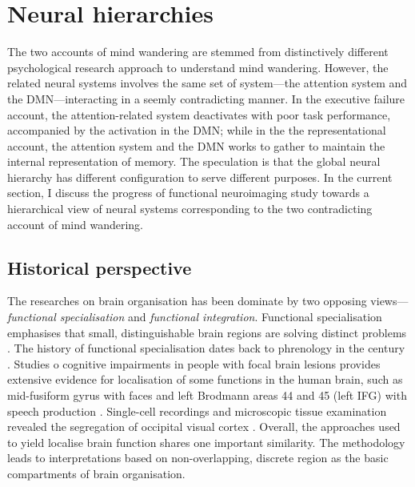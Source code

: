 \section{Neural hierarchies}

The two accounts of mind wandering are stemmed from distinctively different psychological research approach to understand mind wandering. However, the related neural systems involves the same set of system---the attention system and the DMN---interacting in a seemly contradicting manner. In the executive failure account, the attention-related system deactivates with poor task performance, accompanied by the activation in the DMN; while in the the representational account, the attention system and the DMN works to gather to maintain the internal representation of memory. The speculation is that the global neural hierarchy has different configuration to serve different purposes. In the current section, I discuss the progress of functional neuroimaging study towards a hierarchical view of neural systems corresponding to the two contradicting account of mind wandering.

\subsection{Historical perspective}

The researches on brain organisation has been dominate by two opposing views---\textit{functional specialisation} and \textit{functional integration}. Functional specialisation emphasises that small, distinguishable brain regions are solving distinct problems \cite{Kanwisher2010}. The history of functional specialisation dates back to phrenology in the  century \cite<for more history about functional localisation, see supporting information in >{Kanwisher2010}. Studies o cognitive impairments in people with focal brain lesions provides extensive evidence for localisation of some functions in the human brain, such as mid-fusiform gyrus with faces \cite{Iaria2008} and left Brodmann areas 44 and 45 (left IFG) with speech production \cite{Broca1861}. Single-cell recordings and microscopic tissue examination revealed the segregation of occipital visual cortex \cite{Zeki1978}. Overall, the approaches used to yield localise brain function shares one important similarity. The methodology leads to interpretations based on non-overlapping, discrete region as the basic compartments of brain organisation. 

